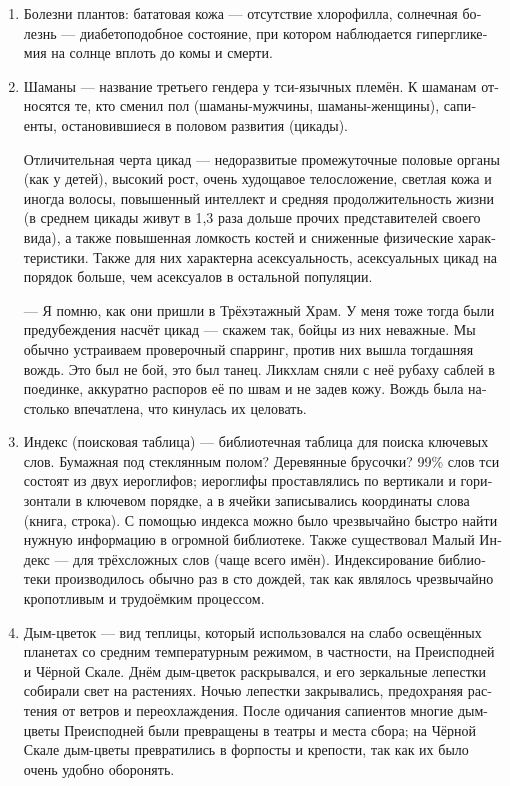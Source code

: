\documentclass[a4paper,12pt,fleqn]{book}\usepackage{polyglossia}\setdefaultlanguage[babelshorthands=true]{russian}\setotherlanguage{english}\defaultfontfeatures{Ligatures=TeX,Mapping=tex-text}\usepackage{xcolor}\newcommand{\ml}[3]{#2}
\begin{document}
{\begin{enumerate}
\item Болезни плантов: бататовая кожа --- отсутствие хлорофилла, солнечная болезнь --- диабетоподобное состояние, при котором наблюдается гипергликемия на солнце вплоть до комы и смерти.

\item Шаманы --- название третьего гендера у тси-язычных племён.
К шаманам относятся те, кто сменил пол (шаманы-мужчины, шаманы-женщины), сапиенты, остановившиеся в половом развития (цикады).

Отличительная черта цикад --- недоразвитые промежуточные половые органы (как у детей), высокий рост, очень худощавое телосложение, светлая кожа и иногда волосы, повышенный интеллект и средняя продолжительность жизни (в среднем цикады живут в 1,3 раза дольше прочих представителей своего вида), а также повышенная ломкость костей и сниженные физические характеристики.
Также для них характерна асексуальность, асексуальных цикад на порядок больше, чем асексуалов в остальной популяции.

--- Я помню, как они пришли в Трёхэтажный Храм.
У меня тоже тогда были предубеждения насчёт цикад --- скажем так, бойцы из них неважные.
Мы обычно устраиваем проверочный спарринг, против них вышла тогдашняя вождь.
Это был не бой, это был танец.
Ликхлам сняли с неё рубаху саблей в поединке, аккуратно распоров её по швам и не задев кожу.
Вождь была настолько впечатлена, что кинулась их целовать.

\item Индекс (поисковая таблица) --- библиотечная таблица для поиска ключевых слов. Бумажная под стеклянным полом?
Деревянные брусочки?
99\% слов тси состоят из двух иероглифов;
иероглифы проставлялись по вертикали и горизонтали в ключевом порядке, а в ячейки записывались координаты слова (книга, строка).
С помощью индекса можно было чрезвычайно быстро найти нужную информацию в огромной библиотеке.
Также существовал Малый Индекс --- для трёхсложных слов (чаще всего имён).
Индексирование библиотеки производилось обычно раз в сто дождей, так как являлось чрезвычайно кропотливым и трудоёмким процессом.

\item Дым-цветок --- вид теплицы, который использовался на слабо освещённых планетах со средним температурным режимом, в частности, на Преисподней и Чёрной Скале.
Днём дым-цветок раскрывался, и его зеркальные лепестки собирали свет на растениях.
Ночью лепестки закрывались, предохраняя растения от ветров и переохлаждения.
После одичания сапиентов многие дым-цветы Преисподней были превращены в театры и места сбора;
на Чёрной Скале дым-цветы превратились в форпосты и крепости, так как их было очень удобно оборонять.


\end{enumerate}}
\end{document}
